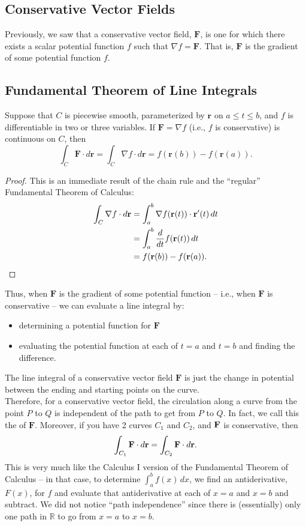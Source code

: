 \subsection{Conservative Vector Fields}
Previously, we saw that a conservative vector field, \(\mathbf{F}\), is one for which there exists a scalar potential function \(f\) such that \(\nabla f = \mathbf{F}\). That is, \(\mathbf{F}\) is the gradient of some potential function \(f\).

\subsection{Fundamental Theorem of Line Integrals}
Suppose that \(C\) is piecewise smooth, parameterized by \(\mathbf{r}\) on \(a \leq t \leq b\), and \(f\) is differentiable in two or three variables. If \(\mathbf{F} = \nabla f\) (i.e., \(f\) is conservative) is continuous on \(C\), then
\[
    \int_C \mathbf{F} \cdot d\mathbf{r} = \int_C \nabla f \cdot d\mathbf{r} = f(\mathbf{r}(b)) - f(\mathbf{r}(a)).
\]

\begin{proof}
    This is an immediate result of the chain rule and the ``regular'' Fundamental Theorem of Calculus:
\begin{align*}
    \int_C \nabla f \cdot d\mathbf{r} &= \int_a^b \nabla f(\mathbf{r}(t)) \cdot \mathbf{r}'(t) \, dt \\
    &= \int_a^b \frac{d}{dt}f(\mathbf{r}(t)) \, dt \\
    &= f(\mathbf{r}(b)) - f(\mathbf{r}(a)). \qedhere
\end{align*}
\end{proof} 


Thus, when \(\mathbf{F}\) is the gradient of some potential function – i.e., when \(\mathbf{F}\) is conservative – we can evaluate a line integral by:
\begin{itemize}
    \item determining a potential function for \(\mathbf{F}\)
    \item evaluating the potential function at each of \(t = a\) and \(t = b\) and finding the difference.
\end{itemize}

The line integral of a conservative vector field \(\mathbf{F}\) is just the change in potential between the ending and starting points on the curve. \\

Therefore, for a conservative vector field, the circulation along a curve from the point \(P\) to \(Q\) is independent of the path to get from \(P\) to \(Q\). In fact, we call this the  of \(\mathbf{F}\). Moreover, if you have 2 curves \(C_{1}\) and \(C_{2}\), and \(\mathbf{F}\) is conservative, then
\[
    \int_{C_{1}} \mathbf{F} \cdot d\mathbf{r} = \int_{C_{2}} \mathbf{F} \cdot d\mathbf{r}.
\]
This is very much like the Calculus I version of the Fundamental Theorem of Calculus – in that case, to determine \(\int_a^b f(x) \, dx\), we find an antiderivative, \(F(x)\), for \(f\) and evaluate that antiderivative at each of \(x = a\) and \(x = b\) and subtract. We did not notice ``path independence'' since there is (essentially) only one path in \(\mathbb{R}\) to go from \(x = a\) to \(x = b\).

